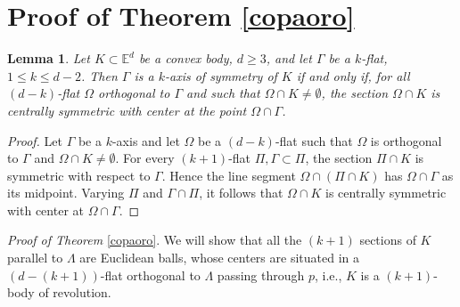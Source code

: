\documentclass[12pt,thmsa]{amsart}
\newcommand{\Ed}{\mathbb{E}^{d}}
\newtheorem{lemma}{Lemma}
\begin{document}
\section{Proof of Theorem \ref{copaoro}}  




\begin{lemma}\label{mundial}
Let $K\subset \Ed$ be a convex body, $d\geq 3$, and let $\Gamma$ be a $k$-flat, $1\leq k \leq d-2$. Then $\Gamma$ is a $k$-axis of symmetry of  $K$ if and only if, for all $(d-k)$-flat $\Omega$ orthogonal  to $\Gamma$ and such that $\Omega \cap K \not=\emptyset$, the section $\Omega \cap K$ is centrally symmetric with center at the point $\Omega \cap \Gamma$.
\end{lemma}  
\begin{proof}
Let $\Gamma$ be a $k$-axis and let $\Omega$ be a $(d-k)$-flat such that $\Omega$ is orthogonal to $\Gamma$ and $\Omega \cap K \not=\emptyset$. For every $(k+1)$-flat $\Pi, \Gamma \subset \Pi$,  the section $\Pi \cap K$ is symmetric with respect to $\Gamma$. Hence the line segment $\Omega \cap (\Pi \cap K)$ has $\Omega \cap \Gamma$ as its midpoint. Varying $\Pi$ and $\Gamma \cap \Pi$, it follows that $\Omega \cap K$ is centrally symmetric with center at $\Omega \cap \Gamma$. 
\end{proof}




 

\textit{Proof of Theorem} \ref{copaoro}. We will show that 
all the $(k+1)$ sections of $K$ parallel to $\Lambda$ are Euclidean balls, whose centers are situated in a $(d-(k+1))$-flat orthogonal to 
$\Lambda$ passing through $p$, i.e., $K$ is a $(k+1)$-body of revolution.
\end{document}
